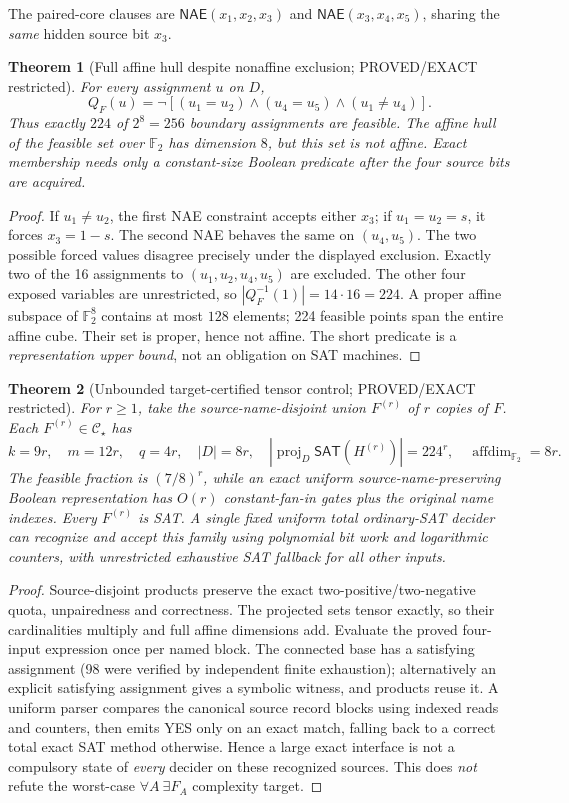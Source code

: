 \documentclass[11pt]{article}
\newtheorem{theorem}{Theorem}
\newcommand{\CS}{\mathcal C_{\star}}
\newcommand{\SAT}{\mathsf{SAT}}
\newcommand{\NAE}{\mathsf{NAE}}
\begin{document}
The paired-core clauses are $\NAE(x_1,x_2,x_3)$ and $\NAE(x_3,x_4,x_5)$, sharing the \emph{same} hidden source bit $x_3$.

\begin{theorem}[Full affine hull despite nonaffine exclusion; PROVED/EXACT restricted]
For every assignment $u$ on $D$,
\[
\boxed{
Q_F(u)=\neg[(u_1=u_2)\wedge(u_4=u_5)\wedge(u_1\ne u_4)].
}
\]
Thus exactly $224$ of $2^8=256$ boundary assignments are feasible. The affine hull of the feasible set over $\mathbb F_2$ has dimension $8$, but this set is \emph{not} affine. Exact membership needs only a constant-size Boolean predicate after the four source bits are acquired.
\end{theorem}
\begin{proof}
If $u_1\ne u_2$, the first NAE constraint accepts either $x_3$; if $u_1=u_2=s$, it forces $x_3=1-s$. The second NAE behaves the same on $(u_4,u_5)$. The two possible forced values disagree precisely under the displayed exclusion. Exactly two of the 16 assignments to $(u_1,u_2,u_4,u_5)$ are excluded. The other four exposed variables are unrestricted, so $|Q_F^{-1}(1)|=14\cdot16=224$. A proper affine subspace of $\mathbb F_2^8$ contains at most $128$ elements; 224 feasible points span the entire affine cube. Their set is proper, hence not affine. The short predicate is a \emph{representation upper bound}, not an obligation on SAT machines.
\end{proof}

\begin{theorem}[Unbounded target-certified tensor control; PROVED/EXACT restricted]
For $r\ge1$, take the source-name-disjoint union $F^{(r)}$ of $r$ copies of $F$. Each $F^{(r)}\in\CS$ has
\[
k=9r,\quad m=12r,\quad q=4r,\quad |D|=8r,\quad
|\operatorname{proj}_{D}\SAT(H^{(r)})|=224^r,\quad
\operatorname{affdim}_{\mathbb F_2}=8r.
\]
The feasible fraction is $(7/8)^r$, while an exact uniform source-name-preserving Boolean representation has $O(r)$ constant-fan-in gates plus the original name indexes. Every $F^{(r)}$ is SAT. A single fixed uniform total ordinary-SAT decider can recognize and accept this family using polynomial bit work and logarithmic counters, with unrestricted exhaustive SAT fallback for all other inputs.
\end{theorem}
\begin{proof}
Source-disjoint products preserve the exact two-positive/two-negative quota, unpairedness and correctness. The projected sets tensor exactly, so their cardinalities multiply and full affine dimensions add. Evaluate the proved four-input expression once per named block. The connected base has a satisfying assignment (98 were verified by independent finite exhaustion); alternatively an explicit satisfying assignment gives a symbolic witness, and products reuse it. A uniform parser compares the canonical source record blocks using indexed reads and counters, then emits YES only on an exact match, falling back to a correct total exact SAT method otherwise. Hence a large exact interface is not a compulsory state of \emph{every} decider on these recognized sources. This does \emph{not} refute the worst-case $\forall A\ \exists F_A$ complexity target.
\end{proof}
\end{document}
